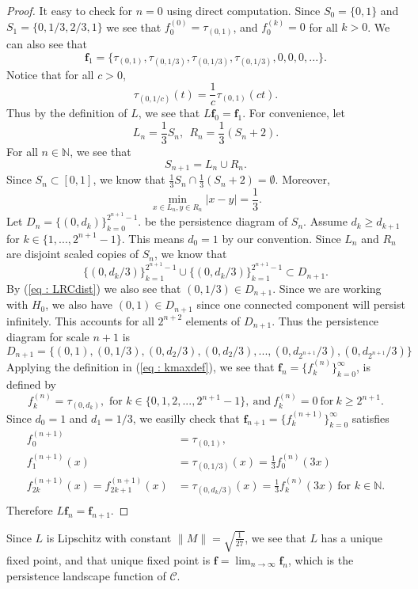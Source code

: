 \documentclass [52pt] {article}
\newcommand{\N}{\mathbb{N}}
\begin{document}
\begin{proof}
It easy to check for $n = 0$ using direct computation.  Since $S_0 = \{0,1\}$ and $S_1 = \{0,1/3,2/3,1\}$ we see that $f_0^{(0)} = \tau_{(0,1)}$, and $f_0^{(k)} = 0$ for all $k> 0$.  We can also see that 
\[\mathbf{f}_1 = \{\tau_{(0,1)}, \tau_{(0,1/3)}, \tau_{(0,1/3)}, \tau_{(0,1/3)},0,0,0,...\}.\]
Notice that for all $c>0$, 
\[\tau_{(0,1/c)}(t) = \frac{1}{c}\tau_{(0,1)}(ct).\]
Thus by the definition of $L$, we see that $L\mathbf{f}_0 = \mathbf{f}_1$.   For convenience, let 
\[L_n = \frac{1}{3}S_n,\:\:R_n = \frac{1}{3}(S_n +2).\]
For all $n\in\N$, we see that
\[S_{n+1} = L_n\cup R_n.\]
Since $S_n\subset[0,1]$, we know that $\frac{1}{3}S_n\cap \frac{1}{3}(S_n+2) = \emptyset$.  Moreover,
\begin{equation}\label{eq : LRCdist}
\min_{x\in L_n,y\in R_n} |x-y| = \frac{1}{3}.
\end{equation}
Let $D_n = \{(0,d_k)\}_{k=0}^{2^{n+1}-1}$. be the persistence diagram of $S_n$.  Assume $d_k\ge d_{k+1}$ for $k\in\{1,...,2^{n+1}-1\}$.  This means $d_0 = 1$ by our convention.  Since $L_n$ and $R_n$ are disjoint scaled copies of $S_n$, we know that 
\[\{(0,d_k/3)\}_{k =1}^{2^{n+1}-1}\cup\{(0,d_k/3)\}_{k =1}^{2^{n+1}-1}\subset D_{n+1}.\]
By (\ref{eq : LRCdist}) we also see that $(0,1/3)\in D_{n+1}$.  Since we are working with $H_0$, we also have $(0,1)\in D_{n+1}$ since one connected component will persist infinitely.  This accounts for all $2^{n+2}$ elements of $D_{n+1}$.  Thus the persistence diagram for scale $n+1$ is 
\[D_{n+1} = \{(0,1), (0,1/3), (0,d_2/3), (0,d_2/3), ...,(0,d_{2^{n+1}}/3), (0,d_{2^{n+1}}/3)\}\]
Applying the definition in (\ref{eq : kmaxdef}), we see that $\mathbf{f}_n = \{f_k^{(n)}\}_{k=0}^\infty$, is defined by
\[f_k^{(n)} = \tau_{(0,d_k)}, \text{ for } k\in\{0,1,2,...,2^{n+1}-1\}, \:\text{and}\:f_k^{(n)}=0\: \text{for}\: k\ge 2^{n+1}.\]
Since $d_0 = 1$ and $d_1 = 1/3$, we easilly check that $\mathbf{f}_{n+1} = \{f_k^{(n+1)}\}_{k=0}^\infty$ satisfies 
\[\begin{split}
f_0^{(n+1)} &= \tau_{(0,1)},\\
f_1^{(n+1)}(x) &= \tau_{(0,1/3)}(x) = \frac{1}{3}f_0^{(n)}(3x)\\
f_{2k}^{(n+1)}(x) = f_{2k+1}^{(n+1)}(x) &= \tau_{(0,d_k/3)}(x) = \frac{1}{3}f_k^{(n)}(3x)\:\text{for } k\in\N .\\ 
\end{split}\]
Therefore $L\mathbf{f}_n = \mathbf{f}_{n+1}$.

\end{proof}
Since $L$ is Lipschitz with constant $\|M\| = \sqrt{\frac{1}{27}}$, we see that $L$ has a unique fixed point, and that unique fixed point is $\mathbf{f} = \lim_{n\to\infty}\mathbf{f}_n$, which is the persistence landscape function of $\mathcal{C}$.
\end{document}
